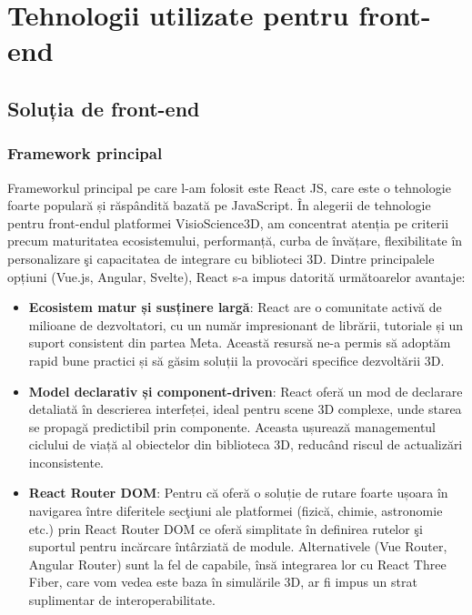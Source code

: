 \chapter{Tehnologii utilizate pentru front-end}
\label{chapter:tehnologii}

\label{sec:proj}
\section{Soluția de front-end}
\subsection{Framework principal}

Frameworkul principal pe care l-am folosit este React JS, care este o tehnologie foarte populară
și răspândită bazată pe JavaScript. În alegerii de tehnologie pentru front-endul platformei VisioScience3D,
am concentrat atenția pe criterii precum maturitatea ecosistemului, performanță, curba de învățare,
flexibilitate în personalizare şi capacitatea de integrare cu biblioteci 3D. Dintre principalele
opțiuni (Vue.js, Angular, Svelte), React s-a impus datorită următoarelor avantaje:

\begin{itemize}
\item
  \textbf{Ecosistem matur și susținere largă}:
    React are o comunitate activă de milioane de dezvoltatori,
    cu un număr impresionant de librării, tutoriale și un suport consistent din partea Meta. 
    Această resursă ne-a permis să adoptăm rapid bune practici și să găsim soluții la provocări 
    specifice dezvoltării 3D.
\item
  \textbf{Model declarativ și component-driven}:
    React oferă un mod de declarare detaliată în descrierea interfeței, ideal pentru scene 3D
    complexe, unde starea se propagă predictibil prin componente. Aceasta ușurează managementul 
    ciclului de viață al obiectelor din biblioteca 3D, reducând riscul de actualizări inconsistente.

\item
  \textbf{React Router DOM}:
    Pentru că oferă o soluție de rutare foarte ușoara în navigarea între diferitele
    secţiuni ale platformei (fizică, chimie, astronomie etc.) prin React Router DOM 
    ce oferă simplitate în definirea rutelor şi suportul pentru incărcare întârziată de module.
    Alternativele (Vue Router, Angular Router) sunt la fel de capabile, însă integrarea lor cu
    React Three Fiber, care vom vedea este baza în simulările 3D, ar fi impus un strat suplimentar
    de interoperabilitate.
\end{itemize}


